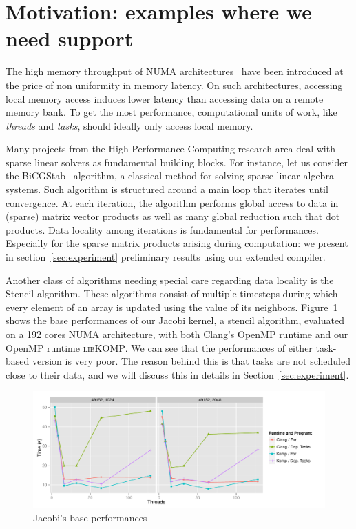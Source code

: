 \documentclass{Styles/llncs}
\newcommand{\libXKOMP}{\textsc{libKOMP}\xspace}
\begin{document}
\section{Motivation: examples where we need support}
\label{sec:motivation}

The high memory throughput  of NUMA architectures~\cite{} have been introduced at the price of non uniformity in memory latency. On such architectures, accessing local memory access induces lower latency than accessing data on a remote memory bank. To get the most performance, computational units of work, like \emph{threads} and \emph{tasks}, should ideally only access local memory.


Many projects from the High Performance Computing research area deal with sparse linear solvers as fundamental building blocks.
For instance, let us consider the BiCGStab~\cite{Saad:2003:IMS:829576} algorithm, a classical method for solving sparse linear algebra systems.  Such algorithm is structured around a main loop that iterates until convergence. At each iteration, the algorithm performs global access to data in (sparse) matrix vector products as well as many global reduction such that dot products. Data locality among iterations is fundamental for performances. Especially for the sparse matrix products arising during computation: we present in section~\ref{sec:experiment} preliminary results using our extended compiler.

Another class of algorithms needing special care regarding data locality is the Stencil algorithm.
These algorithms consist of multiple timesteps during which every element of an
array is updated using the value of its neighbors. Figure~\ref{fig:eval-jacobi-before} shows
the base performances of our Jacobi kernel, a stencil algorithm, evaluated on a
192 cores NUMA architecture, with both Clang's OpenMP runtime and our OpenMP runtime \libXKOMP.
We can see that the performances of either
task-based version is very poor. The reason behind this is that tasks are not
scheduled close to their data, and we will discuss this in details in Section~\ref{sec:experiment}.


\begin{figure}[t]
  \centering
  \includegraphics[scale=0.6]{graphs/jacobi_scale_iomp_komp.pdf}
  \caption{Jacobi's base performances}
\label{fig:eval-jacobi-before}
\end{figure}
\end{document}
